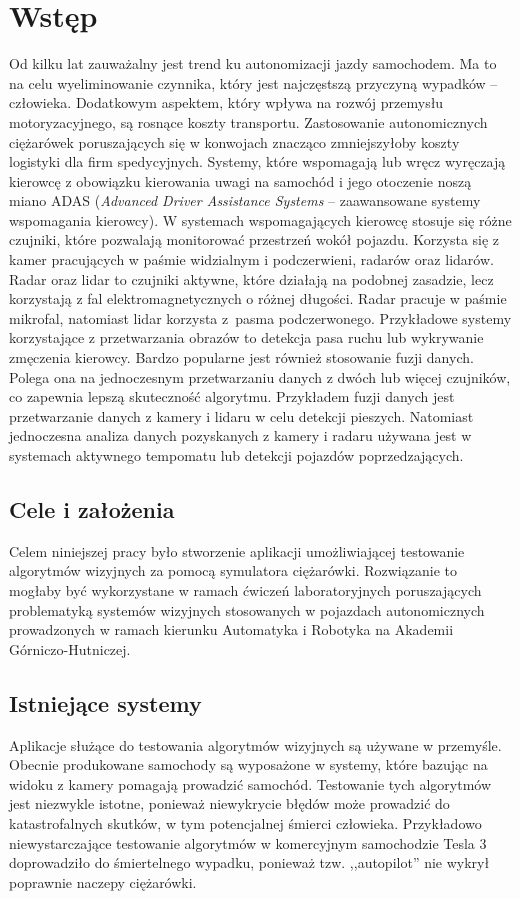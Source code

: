 \chapter{Wstęp}


Od kilku lat zauważalny jest trend ku autonomizacji jazdy samochodem.  
Ma to na celu wyeliminowanie czynnika, który jest najczęstszą przyczyną wypadków -- człowieka. Dodatkowym aspektem, który wpływa na rozwój przemysłu motoryzacyjnego, są rosnące koszty transportu. 
Zastosowanie autonomicznych ciężarówek poruszających się w konwojach znacząco zmniejszyłoby koszty logistyki dla firm spedycyjnych. 
Systemy, które wspomagają lub wręcz wyręczają kierowcę z obowiązku kierowania uwagi na samochód i jego otoczenie noszą miano ADAS (\textit{Advanced Driver Assistance Systems} -- zaawansowane systemy wspomagania kierowcy). 
W systemach wspomagających kierowcę stosuje się różne czujniki, które pozwalają monitorować przestrzeń wokół pojazdu. 
Korzysta się z kamer pracujących w paśmie widzialnym i podczerwieni, radarów oraz lidarów. 
Radar oraz lidar to czujniki aktywne, które działają na podobnej zasadzie, lecz korzystają z fal elektromagnetycznych o różnej długości.
Radar pracuje w paśmie mikrofal, natomiast lidar korzysta z~pasma podczerwonego.
Przykładowe systemy korzystające z przetwarzania obrazów to detekcja pasa ruchu lub wykrywanie zmęczenia kierowcy. 
Bardzo popularne jest również stosowanie fuzji danych. 
Polega ona na jednoczesnym przetwarzaniu danych z dwóch lub więcej czujników, co zapewnia lepszą skuteczność algorytmu. 
Przykładem fuzji danych jest przetwarzanie danych z kamery i lidaru w celu detekcji pieszych.
Natomiast jednoczesna analiza danych pozyskanych z kamery i radaru używana jest w systemach aktywnego tempomatu lub detekcji pojazdów poprzedzających.


\section{Cele i założenia}

Celem niniejszej pracy było stworzenie aplikacji umożliwiającej testowanie algorytmów wizyjnych za pomocą symulatora ciężarówki.
Rozwiązanie to mogłaby być wykorzystane w ramach ćwiczeń laboratoryjnych poruszających problematyką systemów wizyjnych stosowanych w pojazdach autonomicznych prowadzonych w ramach kierunku Automatyka i Robotyka na Akademii Górniczo-Hutniczej.

\section{Istniejące systemy}
Aplikacje służące do testowania algorytmów wizyjnych są używane w przemyśle. 
Obecnie produkowane samochody są wyposażone w systemy, które bazując na widoku z kamery pomagają prowadzić samochód. 
Testowanie tych algorytmów jest niezwykle istotne, ponieważ niewykrycie błędów może prowadzić do katastrofalnych skutków, w tym potencjalnej śmierci człowieka. 
Przykładowo niewystarczające testowanie algorytmów w komercyjnym samochodzie Tesla 3 doprowadziło do śmiertelnego wypadku, ponieważ tzw. ,,autopilot'' nie wykrył poprawnie naczepy ciężarówki.

